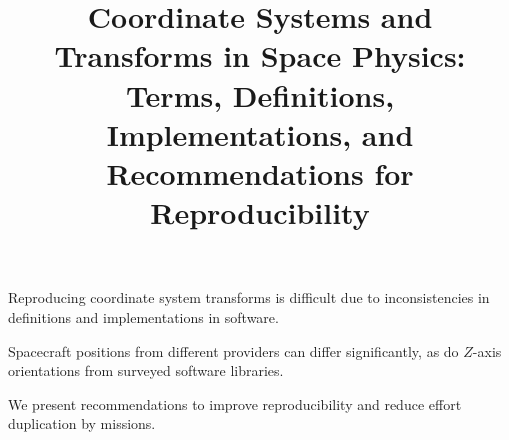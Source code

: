 \documentclass[draft]{agujournal2019}
\begin{document}
\title{Coordinate Systems and Transforms in Space Physics: Terms, Definitions, Implementations, and Recommendations for Reproducibility}






\noindent





\begin{keypoints}
\item Reproducing coordinate system transforms is difficult due to inconsistencies in definitions and implementations in software.
\item Spacecraft positions from different providers can differ significantly, as do $Z$-axis orientations from surveyed software libraries.
\item We present recommendations to improve reproducibility and reduce effort duplication by missions.
\end{keypoints}
\end{document}
